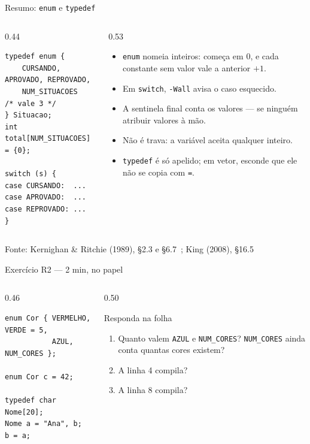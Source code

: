 \documentclass[aspectratio=169]{beamer}
\newcommand{\fonte}[1]{\vfill\hfill{\scriptsize\textcolor{UFSGray}{Fonte: #1}}}
\begin{document}
\begin{frame}[fragile]{Resumo: \texttt{enum} e \texttt{typedef}}
  \begin{columns}[T]
    \begin{column}{0.44\textwidth}
\begin{lstlisting}[style=tinyC]
typedef enum {
    CURSANDO, APROVADO, REPROVADO,
    NUM_SITUACOES     /* vale 3 */
} Situacao;
int total[NUM_SITUACOES] = {0};

switch (s) {
case CURSANDO:  ...
case APROVADO:  ...
case REPROVADO: ...
}
\end{lstlisting}
    \end{column}
    \begin{column}{0.53\textwidth}
      \small
      \begin{itemize}
        \item \texttt{enum} nomeia inteiros: começa em 0, e cada constante
          sem valor vale a anterior $+1$.
        \item Em \texttt{switch}, \texttt{-Wall} avisa o caso esquecido.
        \item A sentinela final conta os valores --- se ninguém atribuir
          valores à mão.
        \item Não é trava: a variável aceita qualquer inteiro.
        \item \texttt{typedef} é só apelido; em vetor, esconde que ele não
          se copia com \texttt{=}.
      \end{itemize}
    \end{column}
  \end{columns}
  \fonte{Kernighan \& Ritchie (1989), §2.3 e §6.7~\cite{kernighan1989c}; King (2008), §16.5~\cite{king2008c}}
\end{frame}

\begin{frame}[fragile]{Exercício R2 --- 2 min, no papel}
  \begin{columns}[T]
    \begin{column}{0.46\textwidth}
\begin{lstlisting}[style=numC]
enum Cor { VERMELHO, VERDE = 5,
           AZUL, NUM_CORES };

enum Cor c = 42;

typedef char Nome[20];
Nome a = "Ana", b;
b = a;
\end{lstlisting}
    \end{column}
    \begin{column}{0.50\textwidth}
      \begin{block}{Responda na folha}
        \begin{enumerate}
          \item[(a)] Quanto valem \texttt{AZUL} e \texttt{NUM\_CORES}?
            \texttt{NUM\_CORES} ainda conta quantas cores existem?
          \item[(b)] A linha 4 compila?
          \item[(c)] A linha 8 compila?
        \end{enumerate}
      \end{block}
    \end{column}
  \end{columns}
\end{frame}
\end{document}
